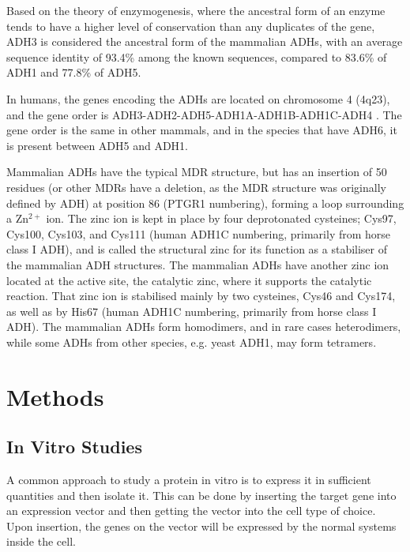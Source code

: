 \documentclass[a4paper, twoside, 12pt, openright]{report}
\begin{document}
Based on the theory of enzymogenesis, where the ancestral form of an enzyme tends to have a higher level of conservation than any duplicates of the gene\cite{danielsson_enzymogenesis:_1992}, ADH3 is considered the ancestral form of the mammalian ADHs, with an average sequence identity of 93.4\% among the known sequences, compared to 83.6\% of ADH1 and 77.8\% of ADH5.

In humans, the genes encoding the ADHs are located on chromosome 4 (4q23), and the gene order is ADH3-ADH2-ADH5-ADH1A-ADH1B-ADH1C-ADH4 \cite{kent_human_2002}. The gene order is the same in other mammals, and in the species that have ADH6, it is present between ADH5 and ADH1.

Mammalian ADHs have the typical MDR structure, but has an insertion of 50 residues (or other MDRs have a deletion, as the MDR structure was originally defined by ADH) at position 86 (PTGR1 numbering), forming a loop surrounding a Zn$^{2+}$ ion. The zinc ion is kept in place by four deprotonated cysteines; Cys97, Cys100, Cys103, and Cys111 (human ADH1C numbering, primarily from horse class I ADH), and is called the structural zinc for its function as a stabiliser of the mammalian ADH structures. The mammalian ADHs have another zinc ion located at the active site, the catalytic zinc, where it supports the catalytic reaction. That zinc ion is stabilised mainly by two cysteines, Cys46 and Cys174, as well as by His67\cite{eklund_structural_1976} (human ADH1C numbering, primarily from horse class I ADH). The mammalian ADHs form homodimers, and in rare cases heterodimers, while some ADHs from other species, e.g. yeast ADH1, may form tetramers\cite{raj_yeast_2014}.


\chapter{Methods}
\label{sec:methods}

\section{In Vitro Studies}

A common approach to study a protein in vitro is to express it in sufficient quantities and then isolate it. This can be done by inserting the target gene into an expression vector and then getting the vector into the cell type of choice. Upon insertion, the genes on the vector will be expressed by the normal systems inside the cell.
\end{document}
